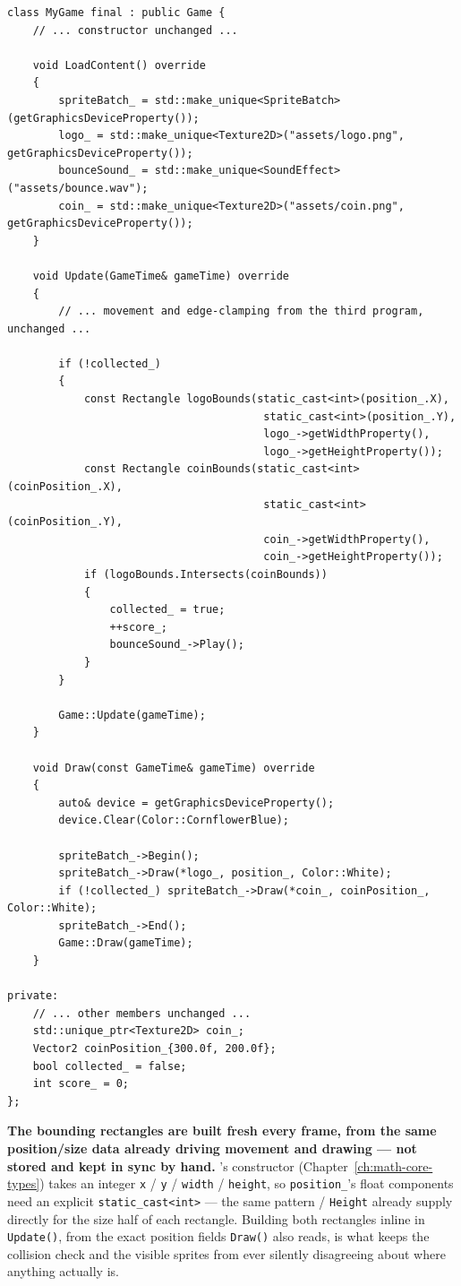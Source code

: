 \begin{lstlisting}
class MyGame final : public Game {
    // ... constructor unchanged ...

    void LoadContent() override
    {
        spriteBatch_ = std::make_unique<SpriteBatch>(getGraphicsDeviceProperty());
        logo_ = std::make_unique<Texture2D>("assets/logo.png", getGraphicsDeviceProperty());
        bounceSound_ = std::make_unique<SoundEffect>("assets/bounce.wav");
        coin_ = std::make_unique<Texture2D>("assets/coin.png", getGraphicsDeviceProperty());
    }

    void Update(GameTime& gameTime) override
    {
        // ... movement and edge-clamping from the third program, unchanged ...

        if (!collected_)
        {
            const Rectangle logoBounds(static_cast<int>(position_.X),
                                        static_cast<int>(position_.Y),
                                        logo_->getWidthProperty(),
                                        logo_->getHeightProperty());
            const Rectangle coinBounds(static_cast<int>(coinPosition_.X),
                                        static_cast<int>(coinPosition_.Y),
                                        coin_->getWidthProperty(),
                                        coin_->getHeightProperty());
            if (logoBounds.Intersects(coinBounds))
            {
                collected_ = true;
                ++score_;
                bounceSound_->Play();
            }
        }

        Game::Update(gameTime);
    }

    void Draw(const GameTime& gameTime) override
    {
        auto& device = getGraphicsDeviceProperty();
        device.Clear(Color::CornflowerBlue);

        spriteBatch_->Begin();
        spriteBatch_->Draw(*logo_, position_, Color::White);
        if (!collected_) spriteBatch_->Draw(*coin_, coinPosition_, Color::White);
        spriteBatch_->End();
        Game::Draw(gameTime);
    }

private:
    // ... other members unchanged ...
    std::unique_ptr<Texture2D> coin_;
    Vector2 coinPosition_{300.0f, 200.0f};
    bool collected_ = false;
    int score_ = 0;
};
\end{lstlisting}

\textbf{The bounding rectangles are built fresh every frame, from the same position/size data
already driving movement and drawing --- not stored and kept in sync by hand.}
's constructor (Chapter~\ref{ch:math-core-types}) takes an integer
\texttt{x} / \texttt{y} / \texttt{width} / \texttt{height}, so \texttt{position\_}'s float
components need an explicit \texttt{static\_cast<int>} --- the same pattern
 / \texttt{Height} already supply directly for the size half of each
rectangle. Building both rectangles inline in \texttt{Update()}, from the exact position
fields \texttt{Draw()} also reads, is what keeps the collision check and the visible sprites
from ever silently disagreeing about where anything actually is.

